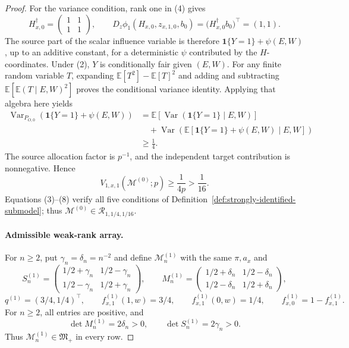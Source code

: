 \documentclass{article}
\begin{document}
\begin{proof}
For the variance condition, rank one in (4) gives
\[
H_{x,0}^{\dagger}=\begin{pmatrix}1&1\\1&1\end{pmatrix},
\qquad
D_z\phi_1(H_{x,0},z_{x,1,0},b_0)
=\bigl(H_{x,0}^{\dagger}b_0\bigr)^{\top}=(1,1).
\tag{6}
\]
The source part of the scalar influence variable is therefore \(\mathbf 1\{Y=1\}+\psi(E,W)\), up to an additive constant, for a deterministic \(\psi\) contributed by the \(H\)-coordinates. Under (2), \(Y\) is conditionally fair given \((E,W)\). For any finite random variable \(T\), expanding \(\mathbb E[T^2]-\mathbb E[T]^2\) and adding and subtracting \(\mathbb E[\mathbb E(T\mid E,W)^2]\) proves the conditional variance identity. Applying that algebra here yields
\[
\begin{aligned}
\operatorname{Var}_{P_{O,0}}\!\left(\mathbf 1\{Y=1\}+\psi(E,W)\right)
&=\mathbb E\!\left[\operatorname{Var}(\mathbf 1\{Y=1\}\mid E,W)\right]\\
&\quad+\operatorname{Var}\!\left(\mathbb E[\mathbf 1\{Y=1\}+\psi(E,W)\mid E,W]\right)\\
&\ge\frac14.
\end{aligned}
\tag{7}
\]
The source allocation factor is \(p^{-1}\), and the independent target contribution is nonnegative. Hence
\[
V_{1,x,1}(\mathcal M^{(0)};p)\ge\frac1{4p}>\frac1{16}.
\tag{8}
\]
Equations (3)--(8) verify all five conditions of Definition~\ref{def:strongly-identified-submodel}; thus \(\mathcal M^{(0)}\in\mathcal R_{1,1/4,1/16}\).

\paragraph{Admissible weak-rank array.}
For \(n\ge2\), put \(\gamma_n=\delta_n=n^{-2}\) and define \(\mathcal M^{(1)}_n\) with the same \(\pi,a_x\) and
\[
S^{(1)}_n=\begin{pmatrix}1/2+\gamma_n&1/2-\gamma_n\\1/2-\gamma_n&1/2+\gamma_n\end{pmatrix},
\qquad
M^{(1)}_n=\begin{pmatrix}1/2+\delta_n&1/2-\delta_n\\1/2-\delta_n&1/2+\delta_n\end{pmatrix},
\]
\[
q^{(1)}=(3/4,1/4)^{\top},\qquad
f^{(1)}_{x,1}(1,w)=3/4,\qquad
f^{(1)}_{x,1}(0,w)=1/4,\qquad
f^{(1)}_{x,0}=1-f^{(1)}_{x,1}.
\tag{9}
\]
For \(n\ge2\), all entries are positive, and
\[
\det M^{(1)}_n=2\delta_n>0,
\qquad
\det S^{(1)}_n=2\gamma_n>0.
\tag{10}
\]
Thus \(\mathcal M^{(1)}_n\in\mathfrak M_{+}\) in every row.


\end{proof}
\end{document}
